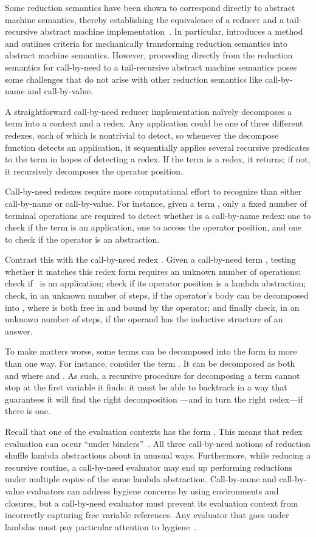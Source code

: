 \documentclass{LMCS}
\theoremstyle{plain}
\theoremstyle{remark}
\begin{document}
Some reduction semantics have been shown to correspond directly to abstract
machine semantics, thereby establishing the equivalence of a reducer and a
tail-recursive abstract machine
implementation~\cite{felleisen86secd,findler09redex}.  In particular,
\citet{danvyTRrefocusing} introduces a method and outlines criteria for
mechanically transforming reduction semantics into abstract machine semantics.
However, proceeding directly from the reduction semantics for call-by-need to a
tail-recursive abstract machine semantics poses some challenges that do not
arise with other reduction semantics like call-by-name and call-by-value.

A straightforward call-by-need reducer implementation na\"ively decomposes a
term into a context and a redex.  Any application could be one of three
different redexes, each of which is nontrivial to detect, so whenever the
decompose function detects an application, it sequentially applies several
recursive predicates to the term in hopes of detecting a redex.  If the term is
a redex, it returns; if not, it recursively decomposes the operator position.


Call-by-need redexes require more computational effort to
recognize than either call-by-name or call-by-value.  For instance, given a
term , only a fixed number of terminal operations are required to detect
whether  is a call-by-name redex: one to check if the term is an
application, one to access the operator position, and one to check if the
operator is an abstraction.

Contrast this with the call-by-need redex .  Given a call-by-need term , testing whether it matches this
redex form requires an unknown number of operations: check if~ is an
application; check if its operator position is a lambda abstraction; check, in
an unknown number of steps, if the operator's body can be decomposed into
, where  is both free in  and bound by the operator; and finally
check, in an unknown number of steps, if the operand has the inductive
structure of an answer.

To make matters worse, some terms can be decomposed into the form  in more
than one way.  For instance, consider the term .
It can be decomposed as both  and 
where  and . As such,
a recursive procedure for decomposing a term cannot stop at the first variable
it finds: it must be able to backtrack in a way that guarantees it will find
the right decomposition ---and in turn the right redex---if there is one.


Recall that one of the evaluation contexts has the form 
.  This means that redex evaluation can occur ``under
binders''~\cite{sabry04recursion,kameyama08closing}.
All three call-by-need notions of reduction shuffle lambda abstractions about
in unusual ways.  Furthermore, while reducing a recursive routine, a
call-by-need evaluator may end up performing reductions under multiple copies
of the same lambda abstraction.  Call-by-name and call-by-value evaluators can
address hygiene concerns by using environments and closures, but a call-by-need
evaluator must prevent its evaluation context from incorrectly capturing free
variable references.  Any evaluator that goes under lambdas must pay
particular attention to hygiene~\cite{xi97underlambda}.
\end{document}
